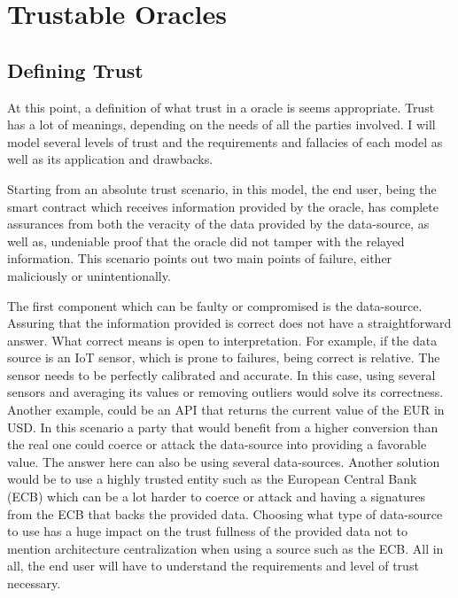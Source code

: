 \chapter{Trustable Oracles }\label{chap:chap3}

\section*{}



\section{Defining Trust}

At this point, a definition of what trust in a oracle is seems appropriate. Trust has a lot of meanings, depending on the needs of all the parties involved. I will model several levels of trust and the requirements and fallacies of each model as well as its application and drawbacks.

Starting from an absolute trust scenario, in this model, the end user, being the smart contract which receives information provided by the oracle, has complete assurances from both the veracity of the data provided by the data-source, as well as, undeniable proof that the oracle did not tamper with the relayed information. This scenario points out two main points of failure, either maliciously or unintentionally. 

The first component which can be faulty or compromised is the data-source. Assuring that the information provided is correct does not have a straightforward answer. What correct means is open to interpretation. For example, if the data source is an IoT sensor, which is prone to failures, being correct is relative. The sensor needs to be perfectly calibrated and accurate. In this case, using several sensors and averaging its values or removing outliers would solve its correctness. Another example, could be an API that returns the current value of the EUR in USD. In this scenario a party that would benefit from a higher conversion than the real one could coerce or attack the data-source into providing a favorable value. The answer here can also be using several data-sources. Another solution would be to use a highly trusted entity such as the European Central Bank (ECB) which can be a lot harder to coerce or attack and having a signatures from the ECB that backs the provided data. Choosing what type of data-source to use has a huge impact on the trust fullness of the provided data not to mention architecture centralization when using a source such as the ECB. All in all, the end user will have to understand the requirements and level of trust necessary.

